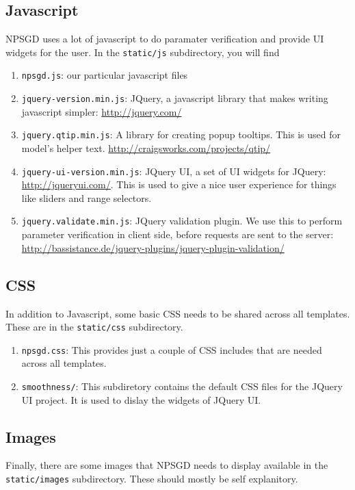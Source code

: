 \documentclass{article}
\newcommand{\mpath}[1]{\texttt{#1}}
\begin{document}
\subsection{Javascript}
NPSGD uses a lot of javascript to do paramater verification and provide UI
widgets for the user. In the \mpath{static/js} subdirectory, you will find
\begin{enumerate}
    \item \texttt{npsgd.js}: our particular javascript files
    \item \texttt{jquery-version.min.js}: JQuery, a javascript library that
    makes writing javascript simpler: \url{http://jquery.com/}
    \item \texttt{jquery.qtip.min.js}: A library for creating popup tooltips.
    This is used for model's helper text.
    \url{http://craigsworks.com/projects/qtip/}
    \item \texttt{jquery-ui-version.min.js}: JQuery UI, a set of UI widgets for
    JQuery: \url{http://jqueryui.com/}. This is used to give a nice user
    experience for things like sliders and range selectors.
    \item \texttt{jquery.validate.min.js}: JQuery validation plugin. We use this
    to perform parameter verification in client side, before requests are sent
    to the server:
    \url{http://bassistance.de/jquery-plugins/jquery-plugin-validation/}
\end{enumerate}

\subsection{CSS}
In addition to Javascript, some basic CSS needs to be shared across all
templates. These are in the \mpath{static/css} subdirectory.
\begin{enumerate}
    \item \texttt{npsgd.css}: This provides just a couple of CSS includes that
    are needed across all templates.
    \item \texttt{smoothness/}: This subdiretory contains the default CSS files
    for the JQuery UI project. It is used to dislay the widgets of JQuery UI.
\end{enumerate}

\subsection{Images}
Finally, there are some images that NPSGD needs to display available in the
\mpath{static/images} subdirectory. These should mostly be self explanitory. 
\end{document}
